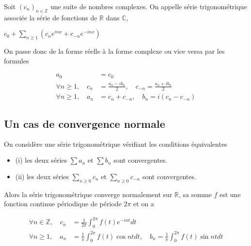 \begin{de}
Soit $(c_n)_{n \in \mathbb{Z}}$ une
suite de nombres complexes. On appelle série trigonométrique associée la
série de fonctions de $\mathbb{R}$ dans $\mathbb{C}$,

$c_0 + \sum_{n \geq 1} (c_n e^{inx} + c_{-n} e^{-inx})$
\end{de}

On passe donc de la forme réelle à la forme complexe ou vice versa par
les formules

\begin{align*} 
a_0 &= c_0 \\
\forall n \geq 1, \quad c_n &= \frac{a_n - ib_n}{2}, \quad c_{-n} = \frac{a_n + ib_n}{2} \\
\forall n \geq 1, \quad a_n &= c_n + c_{-n}, \quad b_n = i(c_n - c_{-n})
\end{align*}

\subsection{Un cas de convergence normale}

\begin{thm}
On considère une série trigonométrique vérifiant les
conditions équivalentes

\begin{itemize}
\itemsep1pt\parskip0pt
\item
  (i) les deux séries $\sum a_n$ et
  $\sum b_n$ sont convergentes.
\item
  (ii) les deux séries
  $\sum_{n \geq 0} c_n$ et
  $\sum_{n \geq 0} c_{-n}$ sont convergentes.
\end{itemize}

Alors la série trigonométrique converge normalement sur $\mathbb{R}$, sa somme $f$
est une fonction continue périodique de période $2\pi$ et on a

\begin{align*} 
\forall n \in \mathbb{Z}, \quad c_n &= \frac{1}{2\pi} \int_0^{2\pi} f(t) e^{-int} dt \\
\forall n \geq 1, \quad a_n &= \frac{1}{\pi} \int_0^{2\pi} f(t) \cos nt dt, \quad b_n = \frac{1}{\pi} \int_0^{2\pi} f(t) \sin nt dt
\end{align*}
\end{thm}

